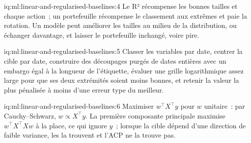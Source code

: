 \begin{solution}{iq:ml:linear-and-regularised-baselines:4}
Le R² récompense les bonnes tailles et chaque action~; un portefeuille récompense le classement aux extrêmes et paie la rotation.
Un modèle peut améliorer les tailles au milieu de la distribution, ou échanger davantage, et laisser le portefeuille inchangé, voire pire.
\end{solution}

\begin{solution}{iq:ml:linear-and-regularised-baselines:5}
Classer les variables par date, centrer la cible par date, construire des découpages purgés de dates entières avec un embargo égal à la longueur de l'étiquette,
évaluer une grille logarithmique assez large pour que ses deux extrémités soient moins bonnes, et retenir la valeur la plus pénalisée à moins d'une
erreur type du meilleur.
\end{solution}

\begin{solution}{iq:ml:linear-and-regularised-baselines:6}
Maximiser $w^\top X^\top y$ pour $w$ unitaire~: par Cauchy--Schwarz, $w\propto X^\top y$. La première composante principale maximise
$w^\top X^\top Xw$ à la place, ce qui ignore $y$~; lorsque la cible dépend d'une direction de faible variance, les  la trouvent et l'ACP
ne la trouve pas.
\end{solution}
